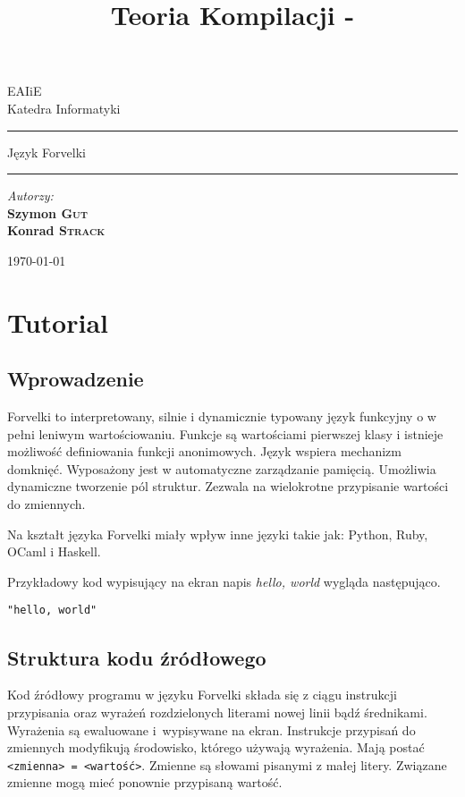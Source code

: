 \documentclass[4paper,10pt]{article}
\title{Teoria Kompilacji - \labtitle}
\author{\labauthors}
\def \labtitle {Język Forvelki}
\begin{document}
  \begin{titlepage}
    \begin{center}
      \vskip 1cm
      EAIiE \\ Katedra Informatyki \vskip 3cm

      \hrule \medskip
      \huge \labtitle
 \\ \smallskip
      \normalsize
      \smallskip \hrule


    \end{center}

      \vskip 10cm
      \normalsize
      \noindent \emph{Autorzy:}\smallskip\\
		\textbf{Szymon \textsc{Gut}}\\
		\textbf{Konrad \textsc{Strack}}

    \begin{center}
      \vfill
      \today
    \end{center}

  \end{titlepage}

\setcounter{section}{0}

\section{Tutorial}

\subsection{Wprowadzenie}
Forvelki to interpretowany, silnie i dynamicznie typowany język funkcyjny o w pełni leniwym wartościowaniu.
Funkcje są wartościami pierwszej klasy i istnieje możliwość definiowania funkcji anonimowych.
Język wspiera mechanizm domknięć.
Wyposażony jest w automatyczne zarządzanie pamięcią.
Umożliwia dynamiczne tworzenie pól struktur.
Zezwala na wielokrotne przypisanie wartości do zmiennych.

Na kształt języka Forvelki miały wpływ inne języki takie jak: Python, Ruby, OCaml i Haskell.

Przykładowy kod wypisujący na ekran napis \emph{hello, world} wygląda następująco.
\begin{lstlisting}
"hello, world"
\end{lstlisting}


\subsection{Struktura kodu źródłowego}
Kod źródłowy programu w języku Forvelki składa się z ciągu instrukcji przypisania oraz wyrażeń rozdzielonych literami nowej linii bądź średnikami.
Wyrażenia są ewaluowane i~wypisywane na ekran.
Instrukcje przypisań do zmiennych modyfikują środowisko, którego używają wyrażenia.
Mają postać \texttt{<zmienna>~=~<wartość>}.
Zmienne są słowami pisanymi z małej litery.
Związane zmienne mogą mieć ponownie przypisaną wartość.
\end{document}
